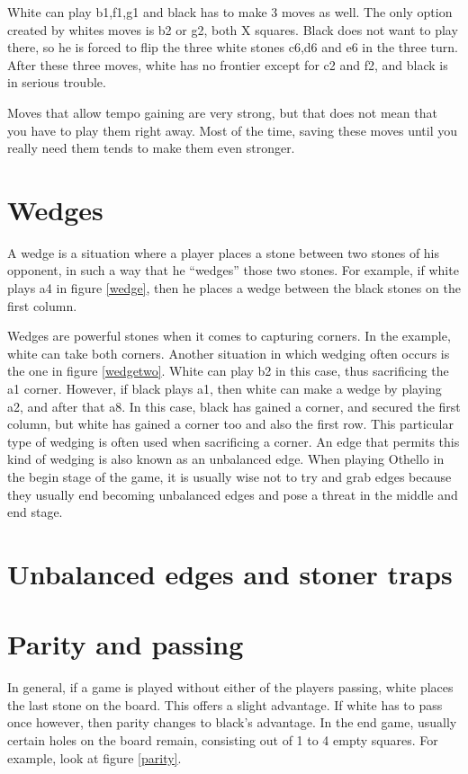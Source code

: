 \documentclass[12pt,twoside]{report}
\begin{document}
White can play b1,f1,g1 and black has to make 3 moves as well. The
only option created by whites moves is b2 or g2, both X squares. Black does
not want to play there, so he is forced to flip the three white
stones c6,d6 and e6 in the three turn. After these three moves,
white has no frontier except for c2 and f2, and black is in
serious trouble.

Moves that allow tempo gaining are very strong, but that does not
mean that you have to play them right away. Most of the time,
saving these moves until you really need them tends to make them
even stronger.

\section{Wedges}
A wedge is a situation where a player places a stone between two
stones of his opponent, in such a way that he ``wedges'' those two
stones. For example, if white plays a4 in figure \ref{wedge}, then
he places a wedge between the black stones on the first column.
\begin{figure}[h]
\wedge
\end{figure}

Wedges are powerful stones when it comes to capturing corners. In
the example, white can take both corners. Another situation in
which wedging often occurs is the one in figure \ref{wedgetwo}.
White can play b2 in this case, thus sacrificing the a1 corner.
However, if black plays a1, then white can make a wedge by playing
a2, and after that a8. In this case, black has gained a corner,
and secured the first column, but white has gained a corner too
and also the first row. This particular type of wedging is often
used when sacrificing a corner. An edge that permits this kind of
wedging is also known as an unbalanced edge. When playing Othello
in the begin stage of the game, it is usually wise not to try and
grab edges because they usually end becoming unbalanced edges and pose a
threat in the middle and end stage.
\begin{figure}
\wedgetwo
\end{figure}

\section{Unbalanced edges and stoner traps}

\section{Parity and passing}
In general, if a game is played without either of the players
passing, white places the last stone on the board. This offers a
slight advantage. If white has to pass once however, then parity
changes to black's advantage. In the end game, usually certain
holes on the board remain, consisting out of 1 to 4 empty squares.
For example, look at figure \ref{parity}.
\begin{figure}[ht]
\parity
\end{figure}
\end{document}
